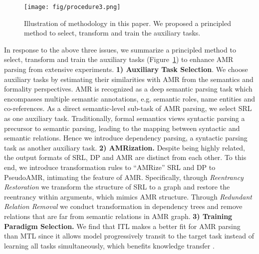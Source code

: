 \documentclass[11pt]{article}
\begin{document}
\begin{figure}[!t]
    \centering
    \texttt{[image: fig/procedure3.png]}
    \caption{Illustration of methodology in this paper. We proposed a principled method to select, transform and train the auxiliary tasks.}
    \label{fig:procedure}
\end{figure}

In response to the above three issues, we summarize a principled method to select, transform and train the auxiliary tasks (Figure~\ref{fig:procedure}) to enhance AMR parsing from extensive experiments.
\textbf{1) Auxiliary Task Selection}. We choose auxiliary tasks by estimating their similarities with AMR from the semantics and formality perspectives. AMR is recognized as a deep semantic parsing task which encompasses multiple semantic annotations, e.g. semantic roles, name entities and co-references. As a direct semantic-level sub-task of AMR parsing, we select SRL as one auxiliary task. Traditionally, formal semantics views syntactic parsing a precursor to semantic parsing, leading to the mapping between syntactic and semantic relations. Hence we introduce dependency parsing, a syntactic parsing task as another auxiliary task. 
\textbf{2) AMRization.} Despite being highly related, the output formats of SRL, DP and AMR are distinct from each other.  
To this end, we introduce transformation rules to ``AMRize'' SRL and DP to PseudoAMR, intimating the feature of AMR. Specifically, through \textit{Reentrancy Restoration} we transform the structure of SRL to a graph and restore the reentrancy within arguments, which mimics AMR structure. Through \textit{Redundant Relation Removal} we conduct transformation in dependency trees and remove relations that are far from semantic relations in AMR graph.
\textbf{3) Training Paradigm Selection.} We find that ITL makes a better fit for AMR parsing than MTL since it allows model progressively transit to the target task instead of learning all tasks simultaneously, which benefits knowledge transfer \citep{multi-sy}. 
\end{document}
